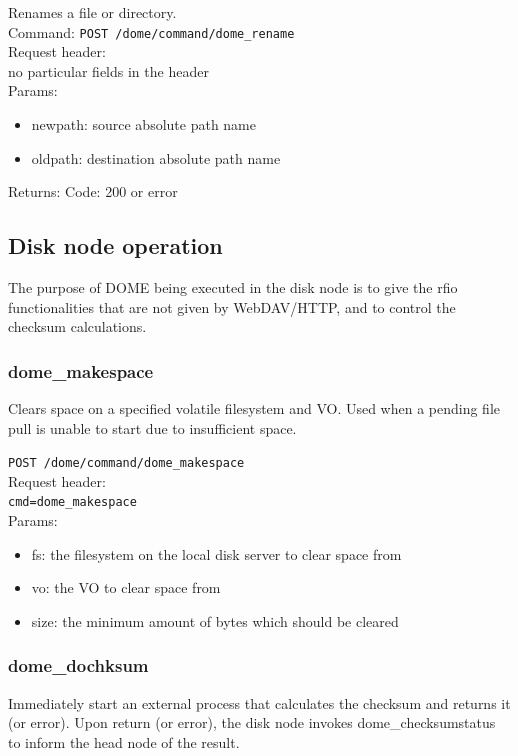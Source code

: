 \documentclass[a4paper,10pt]{scrreprt}
\begin{document}
Renames a file or directory.\\
Command:
\lstinline"POST /dome/command/dome_rename"\\

Request header:\\
no particular fields in the header\\

Params:
\begin{itemize}
 \item newpath: source absolute path name
 \item oldpath: destination absolute path name
\end{itemize}

Returns:
Code: 200 or error




\subsection{Disk node operation}
The purpose of DOME being executed in the disk node is to give the rfio functionalities that are not
given by WebDAV/HTTP, and to control the checksum calculations.\\

\subsubsection{dome\_makespace}

Clears space on a specified volatile filesystem and VO. Used when a pending file pull is unable to start
due to insufficient space.

\lstinline"POST /dome/command/dome_makespace"\\

Request header:\\
\lstinline"cmd=dome_makespace"\\

Params:
\begin{itemize}
 \item fs: the filesystem on the local disk server to clear space from
 \item vo: the VO to clear space from
 \item size: the minimum amount of bytes which should be cleared
\end{itemize}

\subsubsection{dome\_dochksum}
 Immediately start an external process that calculates the checksum and returns it (or error).
 Upon return (or error), the disk node invokes dome\_checksumstatus to inform the head node of the result.
\end{document}
